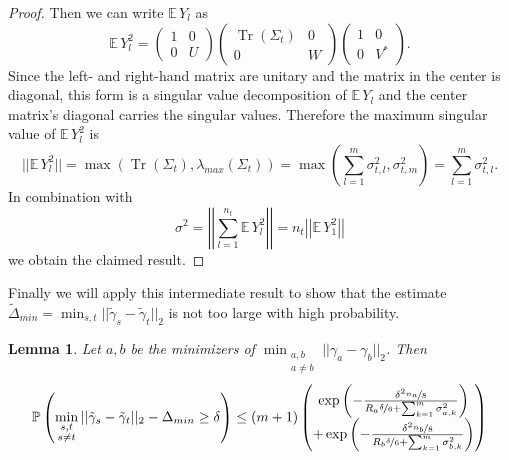 \documentclass[10pt,a4paper]{article}
\newtheorem{lemma}{Lemma}
\DeclareMathOperator{\Tr}{Tr}
\begin{document}
\begin{proof}
  Then we can write $\mathbb{E}\,Y_{l}$ as
  \begin{equation*}
    \mathbb{E}\,Y_{l}^{2} = \begin{pmatrix}
      1 & 0\\
      0 & U
    \end{pmatrix}
    \begin{pmatrix}
      \Tr(\Sigma_{t}) & 0\\
      0 & W
    \end{pmatrix}
    \begin{pmatrix}
      1 & 0\\
      0 & V^{*}
    \end{pmatrix}.
  \end{equation*}
  Since the left- and right-hand matrix are unitary and the matrix in the center is diagonal, this form is a singular value decomposition of $\mathbb{E}\,Y_{l}$ and the center matrix's diagonal carries the singular values.
  Therefore the maximum singular value of $\mathbb{E}\,Y_{l}^{2}$ is
  \begin{equation*}
    ||\mathbb{E}\,Y_{l}^{2}|| = \max\left( \Tr(\Sigma_{t}), \lambda_{max}(\Sigma_{t}) \right) = \max\left( \sum_{l = 1}^{m} \sigma_{t, l}^{2}, \sigma_{t, m}^{2} \right) = \sum_{l = 1}^{m} \sigma_{t, l}^{2}.
  \end{equation*}
  In combination with
  \begin{equation*}
    \sigma^{2} = \left|\left| \sum_{l = 1}^{n_{t}} \mathbb{E}\,Y_{l}^{2} \right|\right| = n_{t} \left|\left| \mathbb{E}\,Y_{1}^{2} \right|\right|
  \end{equation*}
  we obtain the claimed result.
\end{proof}

Finally we will apply this intermediate result to show that the estimate $\tilde{\Delta}_{min} = \min_{s, t} ||\tilde{\gamma}_{s} - \tilde{\gamma}_{t}||_{2}$ is not too large with high probability.

\vspace{.5em}
\begin{lemma}
  \label{lemma:bound}
  Let $a, b$ be the minimizers of $\min_{\substack{a, b\\a \ne b}} ||\gamma_{a} - \gamma_{b}||_{2}$.
  Then
  \begin{equation*}
    \mathbb{P}\left( \min_{\substack{s, t\\s \ne t}} ||\tilde{\gamma}_{s} - \tilde{\gamma}_{t}||_{2} - \Delta_{min} \ge \delta \right) \le (m + 1) \begin{pmatrix} \exp\left( -\frac{\delta^{2} \nicefrac{n_{a}}{8}}{R_{a} \nicefrac{\delta}{6} + \sum_{k = 1}^{m} \sigma_{a,k}^{2}} \right)\\ + \exp\left( -\frac{\delta^{2} \nicefrac{n_{b}}{8}}{R_{b} \nicefrac{\delta}{6} + \sum_{k = 1}^{m} \sigma_{b,k}^{2}} \right) \end{pmatrix}
  \end{equation*}
\end{lemma}
\end{document}
